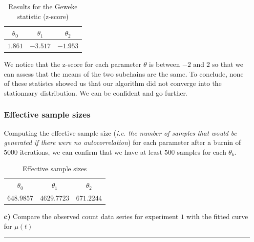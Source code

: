 \begin{table}[H]
	\centering\begin{tabular}{|c|c|c|} \hline 
		$\theta_0$ & $\theta_1$ & $\theta_2$ \\ \hline 
		$1.861$   &   $-3.517$	&   $-1.953$ \\ \hline
	\end{tabular}
	\caption{Results for the Geweke statistic (z-score)}
	\label{tab:metropolis-cw-geweke}
\end{table}

We notice that the z-score for each parameter $\theta$ is between $-2$ and $2$ so that we can assess that the means of the two subchains are the same. To conclude, none of these statistcs showed us that our algorithm did not converge into the stationnary distribution. We can be confident and go further.


\subsubsection*{Effective sample sizes}

Computing the effective sample size (\textit{i.e. the number of samples that would be generated if there were no autocorrelation}) for each parameter after a burnin of $5000$ iterations, we can confirm that we have at least $500$ samples for each $\theta_k$.

\begin{table}[H]
	\centering\begin{tabular}{|c|c|c|} \hline 
		$\theta_0$ & $\theta_1$ & $\theta_2$ \\ \hline 
		$648.9857$  & $4629.7723$ & $671.2244$   \\ \hline
	\end{tabular}
	\caption{Effective sample sizes}
	\label{tab:metropolis-cw-effective-sample-sizes}
\end{table}

\textbf{c)} Compare the observed count data series for experiment $1$ with the fitted curve for $\mu(t)$

\begin{center}\rule{6cm}{0.4pt}\end{center}

